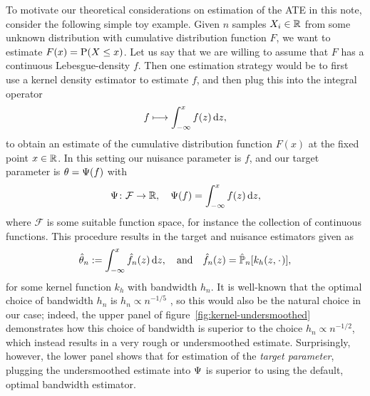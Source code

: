 \documentclass[a4,danish]{article}
\begin{document}
To motivate our theoretical considerations on estimation of the ATE in
this note, consider the following simple toy example. Given $n$
samples $X_i \in \R$ from some unknown distribution with cumulative
distribution function $F$, we want to estimate $F(x) = \P(X \leq x)$.
Let us say that we are willing to assume that $F$ has a continuous
Lebesgue-density $f$. Then one estimation strategy would be to first
use a kernel density estimator to estimate $f$, and then plug this
into the integral operator
  \begin{equation*}
    f \longmapsto \int_{-\infty}^x f(z) \diff z,
  \end{equation*}
  to obtain an estimate of the cumulative distribution function $F(x)$ at the fixed point
  $x \in \R$. In this setting our nuisance parameter is $f$, and our target parameter is
  $\theta = \TT(f)$ with
  \begin{equation*}
    \TT \colon \mathcal{F} \rightarrow \R, \quad \TT(f) = \int_{-\infty}^x f(z) \diff z,
  \end{equation*}
  where $\mathcal{F}$ is some suitable function space, for instance the collection of continuous
  functions. This procedure results in the target and nuisance estimators given as
  \begin{equation}
    \hat{\theta}_n := \int_{-\infty}^x \hat{f}_n(z)  \diff z,
    \quad \text{and} \quad
    \hat{f}_n(z) = \empmeas[k_h(z, \blank)],
  \end{equation}
  for some kernel function $k_h$ with bandwidth $h_n$. It is
  well-known that the optimal choice of bandwidth $h_n$ is
  $h_n \propto n^{-1/5}$ \citep{wasserman2006all}, so this would also
  be the natural choice in our case; indeed, the upper panel of
  figure~\ref{fig:kernel-undersmoothed} demonstrates how this choice
  of bandwidth is superior to the choice $h_n \propto n^{-1/2}$, which
  instead results in a very rough or undersmoothed
  estimate. Surprisingly, however, the lower panel shows that for
  estimation of the \textit{target parameter}, plugging the
  undersmoothed estimate into $\TT$ is superior to using the default,
  optimal bandwidth estimator.   %
\end{document}
